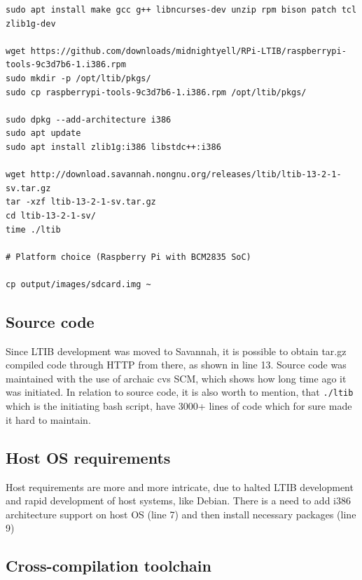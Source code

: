 \documentclass[printmode]{mgr}
\begin{document}

\begin{lstlisting}
sudo apt install make gcc g++ libncurses-dev unzip rpm bison patch tcl zlib1g-dev

wget https://github.com/downloads/midnightyell/RPi-LTIB/raspberrypi-tools-9c3d7b6-1.i386.rpm
sudo mkdir -p /opt/ltib/pkgs/
sudo cp raspberrypi-tools-9c3d7b6-1.i386.rpm /opt/ltib/pkgs/

sudo dpkg --add-architecture i386
sudo apt update
sudo apt install zlib1g:i386 libstdc++:i386

wget http://download.savannah.nongnu.org/releases/ltib/ltib-13-2-1-sv.tar.gz
tar -xzf ltib-13-2-1-sv.tar.gz
cd ltib-13-2-1-sv/
time ./ltib

# Platform choice (Raspberry Pi with BCM2835 SoC)

cp output/images/sdcard.img ~
\end{lstlisting}




\subsection*{Source code}

Since LTIB development was moved to Savannah, it is possible to obtain tar.gz compiled code through HTTP from there, as shown in line 13.
Source code was maintained with the use of archaic cvs SCM, which shows how long time ago it was initiated.
In relation to source code, it is also worth to mention, that \verb|./ltib| which is the initiating bash script, have 3000+ lines of code which for sure made it hard to maintain. 

\subsection*{Host OS requirements}

Host requirements are more and more intricate, due to halted LTIB development and rapid development of host systems, like Debian.
There is a need to add i386 architecture support on host OS (line 7) and then install necessary packages (line 9)

\subsection*{Cross-compilation toolchain}
\end{document}
